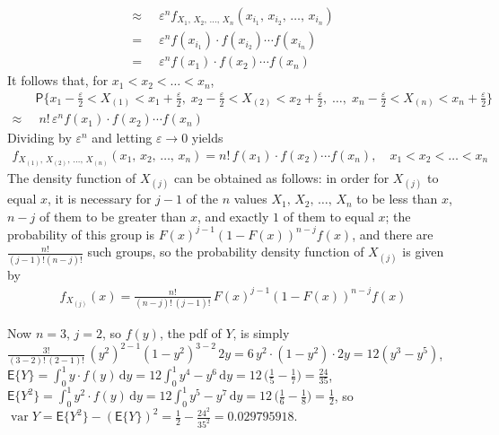 \documentclass[addpoints,12pt,a4paper]{exam}
\DeclareMathOperator\var{var}
\newcommand{\ds}{\displaystyle}
\newcommand{\prb}{\mathsf{P}}
\newcommand{\expc}{\mathsf{E}}
\begin{document}
\begin{questions}
\begin{solution}
\begin{align*}
  \approx\;&\;\varepsilon^n f_{X_1,\,X_2,\,\ldots,\,X_n}(x_{i_1},\,x_{i_2},\,\ldots,\,x_{i_n}) \\
  =\;&\;\varepsilon^n f(x_{i_1})\cdot f(x_{i_2})\cdots f(x_{i_n}) \\
  =\;&\;\varepsilon^n f(x_{1})\cdot f(x_{2})\cdots f(x_{n}) 
  \end{align*}
  It follows that, for $x_1 < x_2 < \ldots < x_n$, 
  \begin{align*}
    &\prb\Big\{x_{1} - \frac{\varepsilon}{2} < X_{(1)} < x_{1} + \frac{\varepsilon}{2},\;x_{2} - \frac{\varepsilon}{2} < X_{(2)} < x_{2} + \frac{\varepsilon}{2},\;\ldots,\;x_{n} - \frac{\varepsilon}{2} < X_{(n)} < x_{n} + \frac{\varepsilon}{2}\Big\} \\
    \approx\;&\;n!\,\varepsilon^n f(x_{1})\cdot f(x_{2})\cdots f(x_{n}) 
  \end{align*}
  Dividing by $\varepsilon^n$ and letting $\varepsilon\to 0$ yields
  \begin{align*}
    f_{X_{(1)},\,X_{(2)},\,\ldots,\,X_{(n)}}(x_{1},\,x_{2},\,\ldots,\,x_{n}) = n!\,f(x_1)\cdot f(x_2)\cdots f(x_n),\quad x_1 < x_2 < \ldots < x_n
  \end{align*}
  The density function of $X_{(j)}$ can be obtained as follows: in order for $X_{(j)}$ to equal $x$, it is necessary for $j - 1$ of the $n$ values $X_1,\,X_2,\,\ldots,\,X_n$ to be less than $x$, $n - j$ of them to be greater than $x$, and exactly $1$ of them to equal $x$; the probability of this group is $\ds F(x)^{j - 1}(1 - F(x))^{n - j} f(x)$, and there are $\ds\frac{n!}{(j - 1)!(n - j)!}$ such groups, so the probability density function of $X_{(j)}$ is given by
  \begin{align*}
    f_{X_{(j)}}(x) = \frac{n!}{(n - j)!\,(j - 1)!}\,F(x)^{j - 1}(1 - F(x))^{n - j}f(x)
  \end{align*}

  Now $n = 3$, $j = 2$, so $f(y)$, the pdf of $Y$, is simply $\ds\frac{3!}{(3 - 2)!\,(2 - 1)!}\,(y^2)^{2 - 1}(1 - y^2)^{3 - 2}\,2y = 6\,y^2\cdot(1 - y^2)\cdot 2y = 12(y^3 - y^5)$, $\ds\expc\{Y\} = \int_0^1 y\cdot f(y)\,\text{d}y = 12\int_0^1 y^4 - y^6\,\text{d}y = 12\,\Big(\frac{1}{5} - \frac{1}{7}\Big) = \frac{24}{35}$, $\ds\expc\{Y^2\} = \int_0^1 y^2\cdot f(y)\,\text{d}y = 12\int_0^1 y^5 - y^7\,\text{d}y = 12\,\Big(\frac{1}{6} - \frac{1}{8}\Big) = \frac{1}{2}$, so $\ds\var{Y} = \expc\{Y^2\} - (\expc\{Y\})^2 = \frac{1}{2} - \frac{24^2}{35^2} = 0.029795918$.
  \end{solution}

\end{questions}
\end{document}
